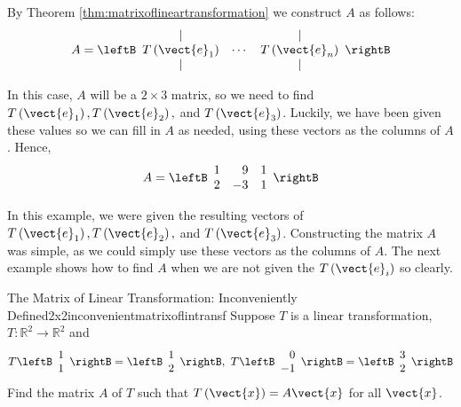 \begin{solution} By Theorem \ref{thm:matrixoflineartransformation} we construct $A$ as follows:
\begin{equation*}
A = 
\leftB
\begin{array}{ccc}
| &  & | \\
T\left( \vect{e}_{1}\right) & \cdots & T\left( \vect{e}_{n}\right) \\
| &  & |
\end{array}
\rightB
\end{equation*}

In this case, $A$ will be a $2 \times 3$ matrix, so we need to find $T
\left(\vect{e}_1 \right), T \left(\vect{e}_2 \right),$ and $T \left(\vect{e}_3
\right)$. Luckily, we have been given these values so we can fill in
$A$ as needed, using these vectors as the columns of $A$.  Hence,
\begin{equation*}
A=\leftB
\begin{array}{rrr}
1 & 9 & 1 \\
2 & -3 & 1
\end{array}
\rightB
\end{equation*}
\end{solution}

In this example, we were given the resulting vectors of $T \left(\vect{e}_1 \right), 
T \left(\vect{e}_2 \right),$ and $T \left(\vect{e}_3 \right)$. Constructing the matrix $A$ was simple, as we
could simply use these vectors as the columns of $A$. The next example shows how to find $A$ when we are not given the $T \left(\vect{e}_i \right)$ so clearly. 

\begin{example}{The Matrix of Linear Transformation: Inconveniently \\ Defined}{2x2inconvenientmatrixoflintransf}
Suppose $T$ is a linear transformation, $T:\mathbb{R}^{2}\rightarrow \mathbb{R}^{2}$ and
\begin{equation*}
T\leftB
\begin{array}{r}
1 \\
1
\end{array}
\rightB =\leftB
\begin{array}{r}
1 \\
2
\end{array}
\rightB ,\ T\leftB
\begin{array}{r}
0 \\
-1 
\end{array}
\rightB =\leftB
\begin{array}{r}
3 \\
2
\end{array}
\rightB
\end{equation*}
Find the matrix $A$ of $T$ such that $T \left( \vect{x} \right)=A\vect{x}$  for all $\vect{x}$.
\end{example}

